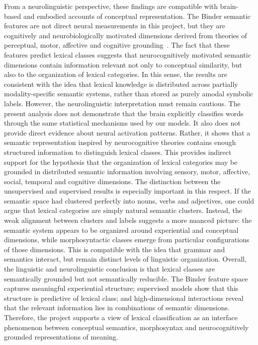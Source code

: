 \documentclass{ipgpmaster}
\begin{document}
From a neurolinguistic perspective, these findings are compatible with brain-based and embodied accounts of conceptual representation. The Binder semantic features are not direct neural measurements in this project, but they are cognitively and neurobiologically motivated dimensions derived from theories of perceptual, motor, affective and cognitive grounding~\cite{binder2016toward,meteyard2012coming,barsalou1999perceptual}. The fact that these features predict lexical classes suggests that neurocognitively motivated semantic dimensions contain information relevant not only to conceptual similarity, but also to the organization of lexical categories. In this sense, the results are consistent with the idea that lexical knowledge is distributed across partially modality-specific semantic systems, rather than stored as purely amodal symbolic labels.
However, the neurolinguistic interpretation must remain cautious. The present analysis does not demonstrate that the brain explicitly classifies words through the same statistical mechanisms used by our models. It also does not provide direct evidence about neural activation patterns. Rather, it shows that a semantic representation inspired by neurocognitive theories contains enough structured information to distinguish lexical classes. This provides indirect support for the hypothesis that the organization of lexical categories may be grounded in distributed semantic information involving sensory, motor, affective, social, temporal and cognitive dimensions.
The distinction between the unsupervised and supervised results is especially important in this respect. If the semantic space had clustered perfectly into nouns, verbs and adjectives, one could argue that lexical categories are simply natural semantic clusters. Instead, the weak alignment between clusters and labels suggests a more nuanced picture: the semantic system appears to be organized around experiential and conceptual dimensions, while morphosyntactic classes emerge from particular configurations of those dimensions. This is compatible with the idea that grammar and semantics interact, but remain distinct levels of linguistic organization.
Overall, the linguistic and neurolinguistic conclusion is that lexical classes are semantically grounded but not semantically reducible. The Binder feature space captures meaningful experiential structure; supervised models show that this structure is predictive of lexical class; and high-dimensional interactions reveal that the relevant information lies in combinations of semantic dimensions. Therefore, the project supports a view of lexical classification as an interface phenomenon between conceptual semantics, morphosyntax and neurocognitively grounded representations of meaning.
\end{document}
